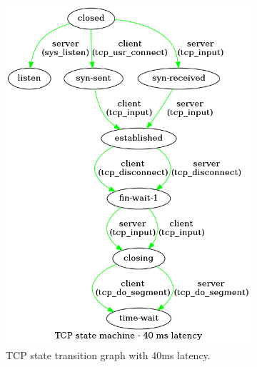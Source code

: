 \documentclass[a4paper,10pt]{article}
\begin{document}
\begin{figure}[]
\begin{subfigure}{.30\textwidth}
   \includegraphics[width=\textwidth]{images/TCP_state_machine_40_ms.png}
    \caption{TCP state transition graph with 40ms latency.}
    \label{fig:40ms_latency}
\end{subfigure}
\qquad
\begin{subfigure}{.30\textwidth}
   \centering

\end{subfigure}
\end{figure}
\end{document}
